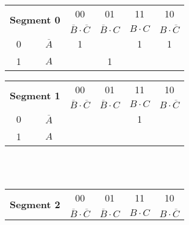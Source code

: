\documentclass[12pt]{article}
\begin{document}
\begin{center}
	\begin{tabular}{|c|c| |c|c|c|c|}
		\hline
		\multicolumn{2}{|c||}{\multirow{2}{*}{\textbf{Segment 0}}} & 00                                & 01                     & 11          & 10                         \\ \cline{3-6}
		\multicolumn{2}{|c||}{}                           & $\overline{B} \cdot \overline{C}$ & $\overline{B} \cdot C$ & $B \cdot C$ & $B \cdot \overline{C}$     \\  \cline{3-6}  \hline \hline
		0                                                 & $\overline{A}$                    & 1                      &             & 1                      & 1 \\ \hline
		1                                                 & $A$                               &                        & 1           &                        &   \\ \hline
	\end{tabular} \hspace*{15mm}
	\begin{tabular}{|c|c| |c|c|c|c|}
		\hline
		\multicolumn{2}{|c||}{\multirow{2}{*}{\textbf{Segment 1}}} & 00                                & 01                     & 11          & 10                       \\ \cline{3-6}
		\multicolumn{2}{|c||}{}                           & $\overline{B} \cdot \overline{C}$ & $\overline{B} \cdot C$ & $B \cdot C$ & $B \cdot \overline{C}$   \\  \cline{3-6}  \hline \hline
		0                                                 & $\overline{A}$                    &                        &             & 1                      & \\ \hline
		1                                                 & $A$                               &                        &             &                        & \\ \hline
	\end{tabular}
	\leavevmode \\\leavevmode\\[15mm]
	\begin{tabular}{|c|c| |c|c|c|c|}
		\hline
		\multicolumn{2}{|c||}{\multirow{2}{*}{\textbf{Segment 2}}} & 00                                & 01                     & 11          & 10                         \\ \cline{3-6}
		\multicolumn{2}{|c||}{}                           & $\overline{B} \cdot \overline{C}$ & $\overline{B} \cdot C$ & $B \cdot C$ & $B \cdot \overline{C}$     \\  \cline{3-6}  \hline \hline

\end{tabular}
\end{center}
\end{document}
